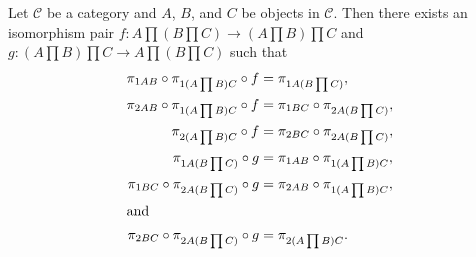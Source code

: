 \documentclass[../math.tex]{subfiles}
\begin{document}
\begin{theorem} \label{product_assoc}
    Let $\mathcal C$ be a category and $A$, $B$, and $C$ be objects in $\mathcal
    C$.  Then there exists an isomorphism pair $f : A \prod (B \prod C) \to (A
    \prod B) \prod C$ and $g : (A \prod B) \prod C \to A \prod (B \prod C)$ such
    that
    \begin{align*}
        \pi_{1AB} \circ \pi_{1(A \prod B) C} \circ f &= \pi_{1A(B \prod C)}, \\
        \pi_{2AB} \circ \pi_{1(A \prod B) C} \circ f
            &= \pi_{1BC} \circ \pi_{2A(B \prod C)}, \\
        \pi_{2(A \prod B) C} \circ f &= \pi_{2BC} \circ \pi_{2A(B \prod C)}, \\
        \pi_{1A(B \prod C)} \circ g &= \pi_{1AB} \circ \pi_{1(A \prod B) C}, \\
        \pi_{1BC} \circ \pi_{2A(B \prod C)} \circ g
            &= \pi_{2AB} \circ \pi_{1(A \prod B) C}, \\
    \intertext{and}
        \pi_{2BC} \circ \pi_{2A(B \prod C)} \circ g &= \pi_{2(A \prod B) C}.
    \end{align*}
\end{theorem}
\end{document}
